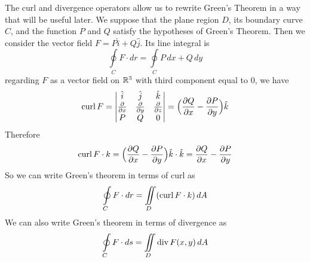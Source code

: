 The curl and divergence operators allow us to rewrite Green's Theorem in a way that will be useful later. We suppose that the plane region $D$, its boundary curve $C$, and the function $P$ and $Q$ satisfy the hypotheses of Green's Theorem. Then we consider the vector field $F = P\hat{i} + Q\hat{j}$. Its line integral is $$\oint\limits_C F \cdot dr = \oint\limits_C P \, dx + Q \, dy $$ regarding $F$ as a vector field on $\mathbb{R}^3$ with third component equal to 0, we have $$\operatorname{curl}{F} = \begin{vmatrix}
    \hat{i}                     & \hat{j}                     & \hat{k} \\
    \frac{\partial}{\partial x} & \frac{\partial}{\partial y} & \frac{\partial}{\partial z} \\
    P                           & Q                           & 0 \\
\end{vmatrix} = \Big(\frac{\partial Q}{\partial x} - \frac{\partial P}{\partial y} \Big)\hat{k}$$ Therefore $$\operatorname{curl}{F} \cdot k = \Big(\frac{\partial Q}{\partial x} - \frac{\partial P}{\partial y} \Big)\hat{k} \cdot \hat{k} = \frac{\partial Q}{\partial x} - \frac{\partial P}{\partial y}$$ So we can write Green's theorem in terms of curl as $$ \oint\limits_C F \cdot dr = \iint\limits_D (\operatorname{curl}{F} \cdot k) \, dA$$ We can also write Green's theorem in terms of divergence as $$\oint\limits_C F \cdot ds =  \iint\limits_D \operatorname{div}{F(x,y)} \, dA$$


